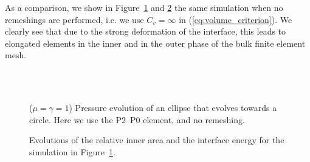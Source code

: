 As a comparison, we show in Figure~\ref{fig:ellipse_smooth} and
\ref{fig:ellipse_both_volumes_smooth} the same simulation when no remeshings are
performed, i.e. we use $C_v=\infty$ in (\ref{eq:volume_criterion}). We clearly
see that due to the strong deformation of the interface, this leads to
elongated elements in the inner and in the outer phase of the bulk finite
element mesh.
\begin{figure}[htbp]
\centering
{}\\
\\
\caption[Stokes ellipse pressure no remeshing]
{($\mu=\gamma=1$) Pressure evolution of an ellipse that evolves towards a
circle. Here we use the P2--P0 element, and no remeshing.}
\label{fig:ellipse_smooth}
\end{figure}
\begin{figure}[htbp]
\centering
{}
\caption[Stokes ellipse inner area and interface energy no remeshing]
{Evolutions of the relative inner area and the interface energy for
the simulation in Figure~\ref{fig:ellipse_smooth}.}
\label{fig:ellipse_both_volumes_smooth}
\end{figure}

